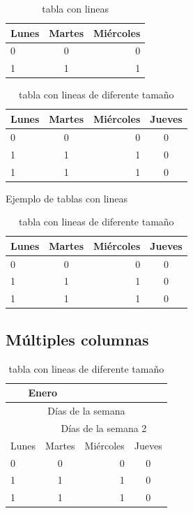 \documentclass[12pt]{article}
\begin{document}
\begin{table}[!ht]
\centering
\begin{tabular}{|l|c|r|}
\hline
Lunes & Martes & Miércoles \\
\hline
0     & 0      & 0 \\
\hline
1     & 1      & 1 \\
\hline
\end{tabular}
\caption{tabla con lineas}
\label{incuirimagen}
\end{table}
\newpage
\begin{table}[H]
\centering
\begin{tabular}{|l|c|r|c|}
\hline
Lunes & Martes & Miércoles & Jueves\\
\hline
0     & 0      & 0  & 0\\
\cline{1-2}
1     & 1      & 1  & 0\\
\cline{1-3}
1     & 1      & 1  & 0\\
\hline
\end{tabular}
\caption{tabla con lineas de diferente tamaño}
\label{lineas}
\end{table}
Ejemplo de tablas con lineas 

\begin{table}[H]
\centering
\begin{tabular}{|l|c|r|c|}
\hline
Lunes & Martes & Miércoles & Jueves\\
\hline
0     & 0      & 0  & 0\\
\cline{2-4}
1     & 1      & 1  & 0\\
\cline{2-3}
1     & 1      & 1  & 0\\
\hline
\end{tabular}
\caption{tabla con lineas de diferente tamaño}
\label{lineas}
\end{table}

\subsection{Múltiples columnas}

\begin{table}[H]
\centering
\begin{tabular}{|l|c|r|c|}
\hline
\multicolumn{2}{|c|}{ Enero } & & \\
\hline
\multicolumn{4}{|c|}{ Días de la semana}\\
\hline
 & \multicolumn{3}{|c|}{ Días de la semana 2}\\
\hline
Lunes & Martes & Miércoles & Jueves\\
\hline
0     & 0      & 0  & 0\\
\cline{2-4}
1     & 1      & 1  & 0\\
\cline{2-3}
1     & 1      & 1  & 0\\
\hline
\end{tabular}
\caption{tabla con lineas de diferente tamaño}
\label{lineas}
\end{table}
\end{document}
